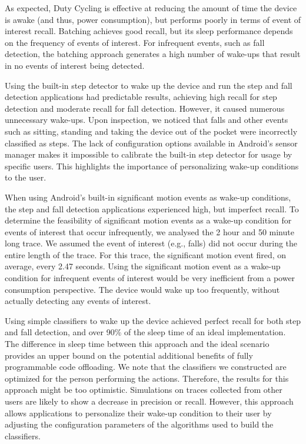 As expected, Duty Cycling is effective at reducing the amount of time
the device is awake (and thus, power consumption), but performs poorly
in terms of event of interest recall.  Batching achieves
good recall, but its sleep performance depends on the frequency of
events of interest.  For infrequent events, such as fall
detection, the batching approach generates a high number 
of wake-ups that result in no events of interest being detected.

Using the built-in step detector to wake up the device and run the step 
and fall detection applications had predictable results, achieving high
recall for step detection and moderate recall for fall detection. However,
it caused numerous unnecessary wake-ups.  Upon inspection, we noticed that 
falls and other events such as sitting, standing and taking the device 
out of the pocket were incorrectly classified as steps.  The lack of 
configuration options available in Android's sensor manager makes it 
impossible to calibrate the built-in step detector for usage by specific 
users.  This highlights the importance of personalizing wake-up
conditions to the user.

When using Android's built-in significant motion events as wake-up 
conditions, the step and fall detection applications experienced high, but
imperfect recall.  To determine the feasibility of significant motion events 
as a wake-up condition for events of interest that occur infrequently, we 
analysed the 2 hour and 50 minute long trace.  We assumed the event of 
interest (e.g., falls) did not occur during the entire length of the 
trace.  For this trace, the significant motion event fired, on average, 
every 2.47 seconds.  Using the significant motion event as a wake-up 
condition for infrequent events of interest would be very inefficient from a 
power consumption perspective.  The device would wake up too
frequently, without actually detecting any events of interest.


Using simple classifiers to wake up the device achieved perfect recall 
for both step and fall detection, and 
over 90\% of the sleep time of an ideal implementation.  The
difference in sleep time between this approach and the ideal scenario 
provides an upper bound on the potential additional benefits of fully
programmable code offloading.  We note that the classifiers we constructed 
are optimized for the person performing the actions.  Therefore, the
results for this approach might be too optimistic.  Simulations on traces 
collected from other users are likely to show a decrease in precision or 
recall.  However, this approach allows applications to personalize their 
wake-up condition to their user by adjusting the configuration parameters 
of the algorithms used to build the classifiers.






 